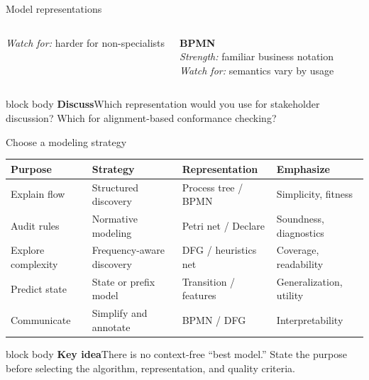 \documentclass[aspectratio=169,11pt]{beamer}
\newcommand{\keyidea}[1]{%
  \begin{beamercolorbox}[rounded=true,sep=0.65em]{block body}
    \textbf{\color{Teal}Key idea}\quad #1
  \end{beamercolorbox}
}
\newcommand{\promptbox}[1]{%
  \begin{beamercolorbox}[rounded=true,sep=0.65em]{block body}
    \textbf{\color{Coral}Discuss}\quad #1
  \end{beamercolorbox}
}
\begin{document}
\begin{frame}[shrink=8]{Model representations}
\begin{columns}[T,onlytextwidth]
      \textit{Watch for:} harder for non-specialists
      \centering
      \textbf{BPMN}\\[0.15cm]
      \textit{Strength:} familiar business notation\\
      \textit{Watch for:} semantics vary by usage
  \end{columns}
  \vspace{0.4cm}
  \promptbox{Which representation would you use for stakeholder discussion?
  Which for alignment-based conformance checking?}
\end{frame}

\begin{frame}{Choose a modeling strategy}
  \small
  \begin{tabular}{@{}
    >{\raggedright\arraybackslash}p{}
    >{\raggedright\arraybackslash}p{}
    >{\raggedright\arraybackslash}p{}
    >{\raggedright\arraybackslash}p{}@{}}
    \toprule
    Purpose & Strategy & Representation & Emphasize\\
    \midrule
    Explain flow & Structured discovery & Process tree / BPMN & Simplicity, fitness\\
    Audit rules & Normative modeling & Petri net / Declare & Soundness, diagnostics\\
    Explore complexity & Frequency-aware discovery & DFG / heuristics net & Coverage, readability\\
    Predict state & State or prefix model & Transition / features & Generalization, utility\\
    Communicate & Simplify and annotate & BPMN / DFG & Interpretability\\
    \bottomrule
  \end{tabular}
  \vspace{0.45cm}
  \keyidea{There is no context-free ``best model.'' State the purpose before
  selecting the algorithm, representation, and quality criteria.}
\end{frame}
\end{document}
